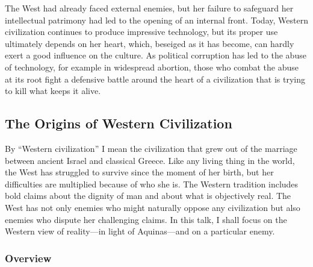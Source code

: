 \documentclass[twocolumn]{article}
\begin{document}
The West had already faced external enemies, but her failure to safeguard her
intellectual patrimony had led to the opening of an internal front.  Today,
Western civilization continues to produce impressive technology, but its proper
use ultimately depends on her heart, which, beseiged as it has become, can
hardly exert a good influence on the culture. As political corruption has led
to the abuse of technology, for example in widespread abortion, those who
combat the abuse at its root fight a defensive battle around the heart of a
civilization that is trying to kill what keeps it alive.

\subsection{The Origins of Western Civilization}

By ``Western civilization'' I mean the civilization that grew out of the
marriage between ancient Israel and classical Greece.  Like any living thing in
the world, the West has struggled to survive since the moment of her birth, but
her difficulties are multiplied because of who she is.  The Western tradition
includes bold claims about the dignity of man and about what is objectively
real.  The West has not only enemies who might naturally oppose any
civilization but also enemies who dispute her challenging claims.  In this
talk, I shall focus on the Western view of reality---in light of Aquinas---and
on a particular enemy.

\subsubsection{Overview}
\end{document}
